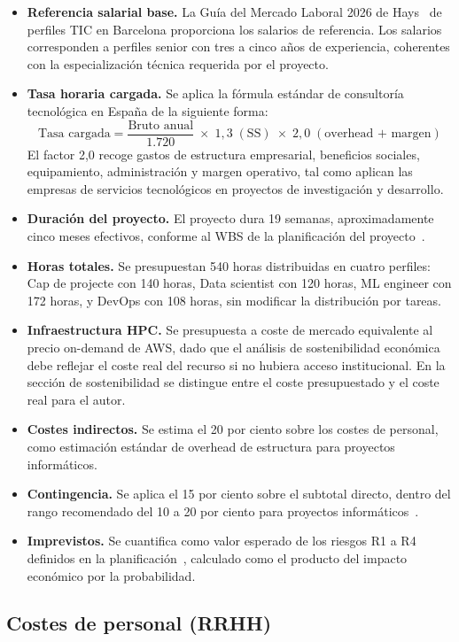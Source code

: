 \documentclass[11pt,a4paper]{article}
\begin{document}
\begin{itemize}[nosep]
\item \textbf{Referencia salarial base.} La Guía del Mercado Laboral 2026 de Hays~\cite{hays2026} de perfiles TIC en Barcelona proporciona los salarios de referencia. Los salarios corresponden a perfiles senior con tres a cinco años de experiencia, coherentes con la especialización técnica requerida por el proyecto.
\item \textbf{Tasa horaria cargada.} Se aplica la fórmula estándar de consultoría tecnológica en España de la siguiente forma:
\[
\text{Tasa cargada} = \frac{\text{Bruto anual}}{1.720}\;\times\;1{,}3\;(\text{SS})\;\times\;2{,}0\;(\text{overhead + margen})
\]
El factor 2,0 recoge gastos de estructura empresarial, beneficios sociales, equipamiento, administración y margen operativo, tal como aplican las empresas de servicios tecnológicos en proyectos de investigación y desarrollo.
\item \textbf{Duración del proyecto.} El proyecto dura 19 semanas, aproximadamente cinco meses efectivos, conforme al WBS de la planificación del proyecto~\cite{gep23e2}.
\item \textbf{Horas totales.} Se presupuestan 540 horas distribuidas en cuatro perfiles: Cap de projecte con 140 horas, Data scientist con 120 horas, ML engineer con 172 horas, y DevOps con 108 horas, sin modificar la distribución por tareas.
\item \textbf{Infraestructura HPC.} Se presupuesta a coste de mercado equivalente al precio on-demand de AWS, dado que el análisis de sostenibilidad económica debe reflejar el coste real del recurso si no hubiera acceso institucional. En la sección de sostenibilidad se distingue entre el coste presupuestado y el coste real para el autor.
\item \textbf{Costes indirectos.} Se estima el 20 por ciento sobre los costes de personal, como estimación estándar de overhead de estructura para proyectos informáticos.
\item \textbf{Contingencia.} Se aplica el 15 por ciento sobre el subtotal directo, dentro del rango recomendado del 10 a 20 por ciento para proyectos informáticos~\cite{gep23}.
\item \textbf{Imprevistos.} Se cuantifica como valor esperado de los riesgos R1 a R4 definidos en la planificación~\cite{gep23e2}, calculado como el producto del impacto económico por la probabilidad.
\end{itemize}

\subsection{Costes de personal (RRHH)}
\end{document}
